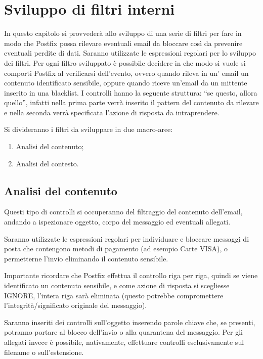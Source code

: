    \section{Sviluppo di filtri interni}
    In questo capitolo si provvederà allo sviluppo di una serie di filtri per fare in modo che Postfix possa 
    rilevare eventuali email da bloccare così da prevenire eventuali perdite di dati. 
    Saranno utilizzate le espressioni regolari per lo sviluppo dei filtri. Per ogni filtro sviluppato è possibile 
    decidere in che modo si vuole si comporti Postfix al verificarsi dell’evento, 
    ovvero quando rileva in un’ email un contenuto identificato sensibile, oppure quando riceve un’email da un 
    mittente inserito in una blacklist.
    I controlli hanno la seguente struttura: “se questo, allora quello”, 
    infatti nella prima parte verrà inserito il pattern del contenuto da rilevare e nella seconda verrà 
    specificata l’azione di risposta da intraprendere.

    Si divideranno i filtri da sviluppare in due macro-aree:

    \begin{enumerate}
        \item Analisi del contenuto;
        \item Analisi del contesto.
    \end{enumerate}

    \subsection{Analisi del contenuto}
    Questi tipo di controlli si occuperanno del filtraggio del contenuto dell'email, 
    andando a ispezionare oggetto, corpo del messaggio ed eventuali allegati. 
    
    Saranno utilizzate le espressioni regolari per individuare e bloccare messaggi di posta che contengono metodi di 
    pagamento (ad esempio Carte VISA), o permetterne l’invio eliminando il contenuto sensibile. 
    
    Importante ricordare che Postfix effettua il controllo riga per riga, quindi se viene identificato un 
    contenuto sensibile, e come azione di risposta si scegliesse IGNORE, 
    l’intera riga sarà eliminata (questo potrebbe compromettere l’integrità/significato originale del messaggio). 
    
    Saranno inseriti dei controlli sull’oggetto inserendo parole chiave che, se presenti, 
    potranno portare al blocco dell’invio o alla quarantena del messaggio. Per gli allegati invece è possibile, nativamente,
    effettuare controlli esclusivamente sul filename o sull’estensione. 

